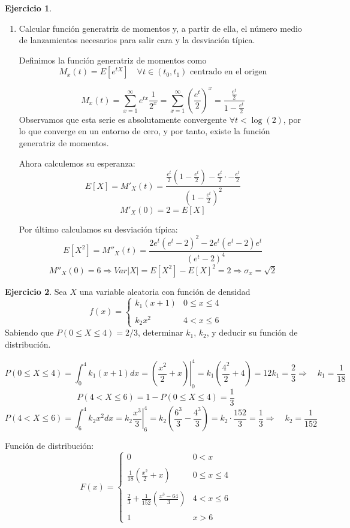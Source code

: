 \documentclass[a4paper, 12pt]{article}
\theoremstyle{definition}
\newtheorem{ej}{Ejercicio}
\begin{document}
\begin{ej}
\begin{enumerate}[label=\textit{\alph*)}]
	\item Calcular función generatriz de momentos y, a partir de ella, el número medio de lanzamientos necesarios para salir cara y la desviación típica.
	
Definimos la función generatriz de momentos como
\[
M_x(t) = E[e^{tX}] \quad \forall t \in (t_0, t_1) \text{ centrado en el origen}
\]

\[
	M_x(t) = \sum_{x=1}^{\infty} e^{tx} \frac{1}{2^x} = \sum_{x=1}^{\infty} \left( \frac{e^t}{2} \right)^x = \frac{\frac{e^t}{2}}{1- \frac{e^t}{2}}
\]
Observamos que esta serie es absolutamente convergente \(\forall t < \log (2)\), por lo que converge en un entorno de cero, y por tanto, existe la función generatriz de momentos.

Ahora calculemos su esperanza:
\[
	E[X] = M'_X(t) = \frac{\frac{e^t}{2}(1-\frac{e^t}{2}) - \frac{e^t}{2} \cdot - \frac{e^t}{2}}{(1-\frac{e^t}{2})^2}
\]
\[
	M'_X(0) = 2 = E[X]
\]

Por último calculamos su desviación típica:
\[
	E[X^2] = M''_X(t) = \frac{2e^t (e^t -2)^2 - 2e^t (e^t-2)e^t}{(e^t-2)^4}
\]
\[
	M''_X(0) = 6 \Rightarrow Var|X| = E[X^2] - E[X]^2 = 2 \Rightarrow \sigma_x = \sqrt{2}
\]

\end{enumerate}

\end{ej}

\begin{ej}
	Sea $X$ una variable aleatoria con función de densidad
	\[
	f(x) = \left\{ \begin{array}{cc}
	k_1(x+1) & 0 \leq x \leq 4 \\
	& \\
	k_2x^2 & 4 < x \leq 6
	\end{array} \right.
	\]
	Sabiendo que \(P(0 \leq X \leq 4) = 2/3\), determinar \(k_1\), \(k_2\), y deducir su función de distribución.
	
	\[P(0\leq X\leq 4) = \int_0^4 k_1(x+1) dx = \left. \left(\frac{x^2}{2}+x\right)\right|^4_0 = k_1\left(\frac{4^2}{2}+4\right) = 12k_1 = \frac{2}{3} \Longrightarrow \quad k_1 = \frac{1}{18}\]
	\[P(4<X\leq 6) = 1 - P(0 \leq X \leq 4) = \frac{1}{3}\]
	\[P(4 < X \leq 6) = \int_6^4 k_2x^2 dx = k_2 \left.\frac{x^3}{3}\right|_6^4 = k_2\left(\frac{6^3}{3}-\frac{4^3}{3}\right)= k_2\cdot \frac{152}{3} = \frac{1}{3}\Longrightarrow\quad k_2 = \frac{1}{152}\]
	
	\medskip
	
	Función de distribución:
	\[
	F(x) = \left\{ \begin{array}{cc}
	0 & 0 <x \\
	& \\
	\frac{1}{18}\left(\frac{x^2}{2}+x\right) & 0\leq x \leq 4 \\
	& \\
	\frac{2}{3} + \frac{1}{152}\left(\frac{x^3 - 64}{3}\right) & 4 < x \leq 6 \\
	& \\
	1 & x > 6
	\end{array} \right.
	\]
	
	
\end{ej}
\end{document}

